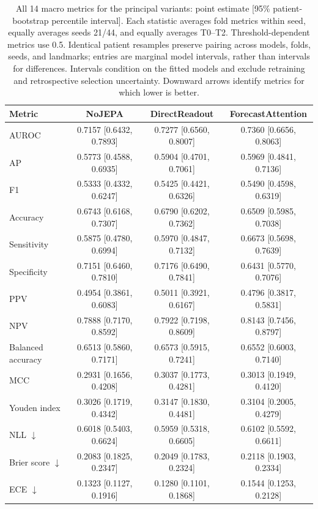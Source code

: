 \begin{table}[t]
\centering
\footnotesize
\setlength{\tabcolsep}{5pt}
\caption{All 14 macro metrics for the principal variants: point estimate [95\% patient-bootstrap percentile interval]. Each statistic averages fold metrics within seed, equally averages seeds 21/44, and equally averages T0--T2. Threshold-dependent metrics use 0.5. Identical patient resamples preserve pairing across models, folds, seeds, and landmarks; entries are marginal model intervals, rather than intervals for differences. Intervals condition on the fitted models and exclude retraining and retrospective selection uncertainty. Downward arrows identify metrics for which lower is better.}
\label{tab:extended_macro}
\begin{tabular}{lccc}
\toprule
Metric & NoJEPA & DirectReadout & ForecastAttention \\
\midrule
AUROC & 0.7157 [0.6432, 0.7893] & 0.7277 [0.6560, 0.8007] & 0.7360 [0.6656, 0.8063] \\
AP & 0.5773 [0.4588, 0.6935] & 0.5904 [0.4701, 0.7061] & 0.5969 [0.4841, 0.7136] \\
F1 & 0.5333 [0.4332, 0.6247] & 0.5425 [0.4421, 0.6326] & 0.5490 [0.4598, 0.6319] \\
Accuracy & 0.6743 [0.6168, 0.7307] & 0.6790 [0.6202, 0.7362] & 0.6509 [0.5985, 0.7038] \\
Sensitivity & 0.5875 [0.4780, 0.6994] & 0.5970 [0.4847, 0.7132] & 0.6673 [0.5698, 0.7639] \\
Specificity & 0.7151 [0.6460, 0.7810] & 0.7176 [0.6490, 0.7841] & 0.6431 [0.5770, 0.7076] \\
PPV & 0.4954 [0.3861, 0.6083] & 0.5011 [0.3921, 0.6167] & 0.4796 [0.3817, 0.5831] \\
NPV & 0.7888 [0.7170, 0.8592] & 0.7922 [0.7198, 0.8609] & 0.8143 [0.7456, 0.8797] \\
Balanced accuracy & 0.6513 [0.5860, 0.7171] & 0.6573 [0.5915, 0.7241] & 0.6552 [0.6003, 0.7140] \\
MCC & 0.2931 [0.1656, 0.4208] & 0.3037 [0.1773, 0.4281] & 0.3013 [0.1949, 0.4120] \\
Youden index & 0.3026 [0.1719, 0.4342] & 0.3147 [0.1830, 0.4481] & 0.3104 [0.2005, 0.4279] \\
NLL $\downarrow$ & 0.6018 [0.5403, 0.6624] & 0.5959 [0.5318, 0.6605] & 0.6102 [0.5592, 0.6611] \\
Brier score $\downarrow$ & 0.2083 [0.1825, 0.2347] & 0.2049 [0.1783, 0.2324] & 0.2118 [0.1903, 0.2334] \\
ECE $\downarrow$ & 0.1323 [0.1127, 0.1916] & 0.1280 [0.1101, 0.1868] & 0.1544 [0.1253, 0.2128] \\
\bottomrule
\end{tabular}
\end{table}
